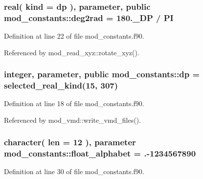 \subsubsection[{\texorpdfstring{deg2rad}{deg2rad}}]{\setlength{\rightskip}{0pt plus 5cm}real( kind = {\bf dp} ), parameter, public mod\+\_\+constants\+::deg2rad = 180.\+\_\+\+D\+P / PI}\hypertarget{namespacemod__constants_a505a7c2ab1e1b2fa75db18a1d3e133b4}{}\label{namespacemod__constants_a505a7c2ab1e1b2fa75db18a1d3e133b4}


Definition at line 22 of file mod\+\_\+constants.\+f90.



Referenced by mod\+\_\+read\+\_\+xyz\+::rotate\+\_\+xyz().

\subsubsection[{\texorpdfstring{dp}{dp}}]{\setlength{\rightskip}{0pt plus 5cm}integer, parameter, public mod\+\_\+constants\+::dp = selected\+\_\+real\+\_\+kind(15, 307)}\hypertarget{namespacemod__constants_ac7aeda7f1802c4ef2a4780773c028214}{}\label{namespacemod__constants_ac7aeda7f1802c4ef2a4780773c028214}


Definition at line 18 of file mod\+\_\+constants.\+f90.



Referenced by mod\+\_\+vmd\+::write\+\_\+vmd\+\_\+files().

\subsubsection[{\texorpdfstring{float\+\_\+alphabet}{float_alphabet}}]{\setlength{\rightskip}{0pt plus 5cm}character( len = 12 ), parameter mod\+\_\+constants\+::float\+\_\+alphabet = \textquotesingle{}.-\/1234567890\textquotesingle{}}\hypertarget{namespacemod__constants_a4b168363a34adf3e1236769aa1ec0fed}{}\label{namespacemod__constants_a4b168363a34adf3e1236769aa1ec0fed}


Definition at line 30 of file mod\+\_\+constants.\+f90.



